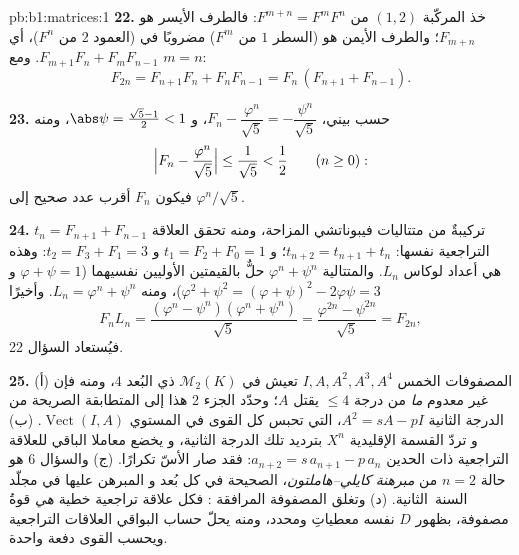 \begin{solution}{pb:b1:matrices:1}
\textbf{22.} خذ المركّبة $(1,2)$ من $F^{m+n} = F^m F^n$: فالطرف
الأيسر هو $F_{m+n}$؛ والطرف الأيمن هو (السطر $1$ من $F^m$)
مضروبًا في (العمود $2$ من $F^n$)، أي $F_{m+1}F_n + F_m F_{n-1}$.
ومع $m = n$:
\[
F_{2n} = F_{n+1}F_n + F_nF_{n-1} = F_n\,(F_{n+1} + F_{n-1}).
\]

\textbf{23.} حسب بيني، $F_n - \dfrac{\varphi^n}{\sqrt5} =
-\dfrac{\psi^n}{\sqrt5}$، و $\abs\psi = \frac{\sqrt5 - 1}2 <
1$، ومنه
\[
\Bigl|F_n - \frac{\varphi^n}{\sqrt5}\Bigr|
\leq \frac{1}{\sqrt5} < \frac12
\qquad (n \geq 0):
\]
فيكون $F_n$ أقرب عدد صحيح إلى $\varphi^n/\sqrt5$.

\textbf{24.} $t_n = F_{n+1} + F_{n-1}$ تركيبةٌ من
متتاليات فيبوناتشي المزاحة، ومنه تحقق العلاقة
التراجعية نفسها: $t_{n+2} = t_{n+1} + t_n$؛ و $t_1 = F_2 + F_0 =
1$ و $t_2 = F_3 + F_1 = 3$: وهذه هي أعداد لوكاس $L_n$.
والمتتالية $\varphi^n + \psi^n$ حلٌّ بالقيمتين الأوليين
نفسيهما ($\varphi + \psi = 1$ و $\varphi^2 + \psi^2 = (
\varphi + \psi)^2 - 2\varphi\psi = 3$)، ومنه $L_n = \varphi^n +
\psi^n$. وأخيرًا
\[
F_n L_n = \frac{(\varphi^n - \psi^n)(\varphi^n +
\psi^n)}{\sqrt5} = \frac{\varphi^{2n} - \psi^{2n}}{\sqrt5} =
F_{2n},
\]
فيُستعاد السؤال 22.

\textbf{25.} (أ) المصفوفات الخمس $I, A, A^2, A^3, A^4$ تعيش في
$\mathcal{M}_2(K)$ ذي البُعد $4$، ومنه فإن  غير معدوم
\emph{ما} من درجة $\leq 4$ يقتل $A$؛ وحدّد الجزء 2 هذا
إلى المتطابقة الصريحة من الدرجة الثانية $A^2 = sA - pI$، التي تحبس كل
القوى في المستوي $\operatorname{Vect}(I, A)$. (ب) و
تردّ القسمة الإقليدية $X^n$ بترديد تلك الدرجة الثانية، و
يخضع معاملا الباقي للعلاقة التراجعية ذات الحدين
$a_{n+2} = s\,a_{n+1} - p\,a_n$: فقد صار الأسّ
تكرارًا. (ج) والسؤال 6 هو حالة $n = 2$ من
\emph{مبرهنة كايلي--هاملتون}، الصحيحة في كل بُعد و
المبرهن عليها في مجلّد السنة~الثانية. (د) وتغلق المصفوفة المرافقة
: فكل علاقة تراجعية خطية \emph{هي} قوةُ مصفوفة، بظهور
 $D$ نفسه معطياتِ  ومحدد،
ومنه يحلّ حساب البواقي العلاقات التراجعية ويحسب القوى
دفعة واحدة.
\end{solution}
